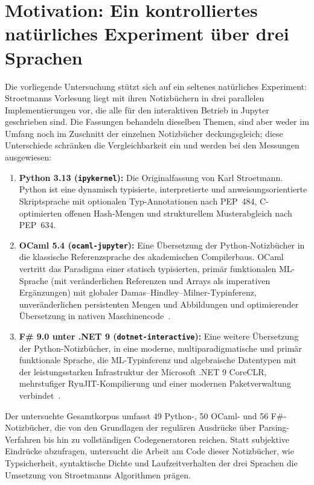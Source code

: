 \section{Motivation: Ein kontrolliertes natürliches Experiment über drei Sprachen}
\label{sec:intro_motivation}

Die vorliegende Untersuchung stützt sich auf ein seltenes natürliches Experiment: Stroetmanns Vorlesung liegt mit ihren Notizbüchern in drei parallelen Implementierungen vor, die alle für den interaktiven Betrieb in Jupyter geschrieben sind.
Die Fassungen behandeln dieselben Themen, sind aber weder im Umfang noch im Zuschnitt der einzelnen Notizbücher deckungsgleich; diese Unterschiede schränken die Vergleichbarkeit ein und werden bei den Messungen ausgewiesen:
\begin{enumerate}
  \item \textbf{Python 3.13 (\texttt{ipykernel}):} Die Originalfassung von Karl Stroetmann.
  Python ist eine dynamisch typisierte, interpretierte und anweisungsorientierte Skriptsprache mit optionalen Typ-Annotationen nach PEP~484, C-optimierten offenen Hash-Mengen und strukturellem Musterabgleich nach PEP~634.
  \item \textbf{OCaml 5.4 (\texttt{ocaml-jupyter}):} Eine Übersetzung der Python-Notizbücher in die klassische Referenzsprache des akademischen Compilerbaus.
  OCaml vertritt das Paradigma einer statisch typisierten, primär funktionalen ML-Sprache (mit veränderlichen Referenzen und Arrays als imperativen Ergänzungen) mit globaler Damas--Hindley--Milner-Typinferenz, unveränderlichen persistenten Mengen und Abbildungen und optimierender Übersetzung in nativen Maschinencode~\cite{leroy2023ocaml,sivaramakrishnan2020retrofitting}.
  \item \textbf{F\# 9.0 unter .NET 9 (\texttt{dotnet-interactive}):} Eine weitere Übersetzung der Python-Notizbücher, in eine moderne, multiparadigmatische und primär funktionale Sprache, die ML-Typinferenz und algebraische Datentypen mit der leistungsstarken Infrastruktur der Microsoft .NET 9 CoreCLR, mehrstufiger RyuJIT-Kompilierung und einer modernen Paketverwaltung verbindet~\cite{syme2020early}.
\end{enumerate}

Der untersuchte Gesamtkorpus umfasst 49 Python-, 50 OCaml- und 56 F\#-Notizbücher, die von den Grundlagen der regulären Ausdrücke über Parsing-Verfahren bis hin zu vollständigen Codegeneratoren reichen.
Statt subjektive Eindrücke abzufragen, untersucht die Arbeit am Code dieser Notizbücher, wie Typsicherheit, syntaktische Dichte und Laufzeitverhalten der drei Sprachen die Umsetzung von Stroetmanns Algorithmen prägen.

